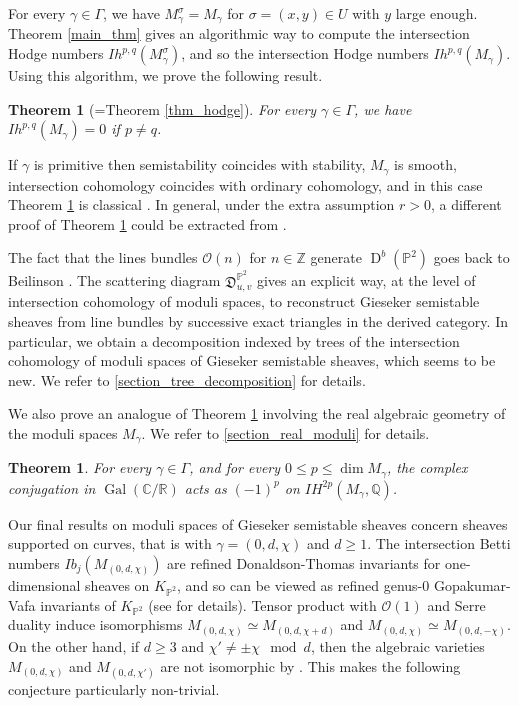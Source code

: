\documentclass[12pt, a4paper]{amsart}
\newtheorem{thm}[defn]{Theorem}
\newcommand\C{\mathbb C}
\newcommand\PP{\mathbb P}
\newcommand\R{\mathbb R}
\newcommand\Q{\mathbb Q}
\newcommand\Z{\mathbb Z}
\newcommand\cO{\mathcal O}
\newcommand\fD{\mathfrak D}
\newcommand\D{\operatorname{D}}
\newcommand\Gal{\operatorname{Gal}}
\begin{document}
For every $\gamma \in \Gamma$, we have 
$M_\gamma^\sigma = M_\gamma$ for $\sigma=(x,y) \in U$ with $y$ large enough. 
Theorem \ref{main_thm} gives an algorithmic way to compute the intersection Hodge numbers $Ih^{p,q}(M_\gamma^\sigma)$, and so the intersection Hodge numbers $Ih^{p,q}(M_\gamma)$. Using this algorithm, we prove the following result.

\begin{thm}[=Theorem \ref{thm_hodge}]\label{thm_hodge_intro}
For every $\gamma \in \Gamma$, we have 
$Ih^{p,q}(M_\gamma)=0$ if $p \neq q$.
\end{thm}

If $\gamma$ is primitive
then semistability coincides with stability,
$M_\gamma$ is smooth, intersection cohomology coincides with ordinary cohomology, and in this case Theorem \ref{thm_hodge_intro} is classical \cite{MR1228610, MR1351502, MR2304330}. In general, under the extra assumption $r>0$, a different proof of Theorem \ref{thm_hodge_intro} could be extracted from \cite{MR3874687}.


The fact that the lines bundles $\cO(n)$ for 
$n \in \Z$ generate $\D^b(\PP^2)$ goes back to Beilinson \cite{MR509388}. The scattering diagram 
$\fD^{\PP^2}_{u,v}$ gives an explicit way, at the level of intersection cohomology of
moduli spaces, to reconstruct Gieseker semistable sheaves from line bundles 
by successive exact triangles in the derived category. 
In particular, we obtain a decomposition indexed by trees of 
the intersection cohomology of moduli spaces of Gieseker semistable sheaves, 
which seems to be new. We refer to
\cref{section_tree_decomposition} for details.

We also prove an analogue of Theorem \ref{thm_hodge_intro} involving the real algebraic geometry of the moduli spaces 
$M_\gamma$. We refer to \cref{section_real_moduli} for details.

\begin{thm} \label{thm_real_moduli_intro}
For every $\gamma \in \Gamma$, and for every $0 \leqslant p \leqslant \dim M_\gamma$, the complex conjugation in
$\Gal(\C/\R)$ acts as $(-1)^p$
on $IH^{2p}(M_\gamma,\Q)$.
\end{thm}

Our final results on moduli spaces of Gieseker semistable sheaves concern sheaves supported on curves, that is with $\gamma=(0,d,\chi)$ and $d \geqslant1$. The intersection Betti numbers $Ib_j(M_{(0,d,\chi)})$ are refined Donaldson-Thomas invariants for one-dimensional sheaves on $K_{\PP^2}$, and so can be viewed as refined genus-$0$
Gopakumar-Vafa invariants of $K_{\PP^2}$ (see \cite{bousseau2019takahashi} for details). 
Tensor product with $\cO(1)$ and Serre duality induce isomorphisms 
$M_{(0,d,\chi)} \simeq M_{(0,d,\chi+d)}$ and $M_{(0,d,\chi)} \simeq M_{(0,d,-\chi)}$.
On the other hand, if $d \geqslant3$ and $\chi' \neq \pm \chi \mod d$, then the algebraic varieties $M_{(0,d,\chi)}$ and $M_{(0,d,\chi')}$ are not isomorphic by \cite[Theorem 8.1]{woolf2013nef}. This makes the following conjecture particularly non-trivial.
\end{document}
